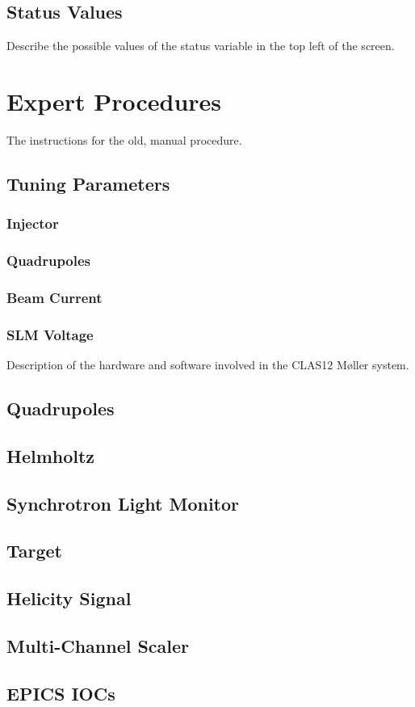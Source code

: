 \documentclass[amsmath,amssymb,notitlepage,12pt]{revtex4}
\begin{document}
\subsection{Status Values}
Describe the possible values of the status variable in the top left of the screen.

\section{Expert Procedures}\label{sec:expert}
The instructions for the old, manual procedure.

\subsection{Tuning Parameters}
\subsubsection{Injector}
\subsubsection{Quadrupoles}
\subsubsection{Beam Current}
\subsubsection{SLM Voltage}

\begin{appendices}
Description of the hardware and software involved in the CLAS12 M{\o}ller system.
\subsection{Quadrupoles}
\subsection{Helmholtz}
\subsection{Synchrotron Light Monitor}
\subsection{Target}
\subsection{Helicity Signal}
\subsection{Multi-Channel Scaler}
\subsection{EPICS IOCs}
\end{appendices}
\end{document}
